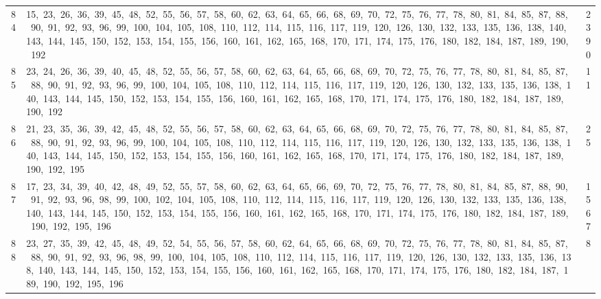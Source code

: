 \begin{longtable}{c|p{}|r}
84 & 15,\ 23,\ 26,\ 36,\ 39,\ 45,\ 48,\ 52,\ 55,\ 56,\ 57,\ 58,\ 60,\ 62,\ 63,\ 64,\ 65,\ 66,\ 68,\ 69,\ 70,\ 72,\ 75,\ 76,\ 77,\ 78,\ 80,\ 81,\ 84,\ 85,\ 87,\ 88,\ 90,\ 91,\ 92,\ 93,\ 96,\ 99,\ 100,\ 104,\ 105,\ 108,\ 110,\ 112,\ 114,\ 115,\ 116,\ 117,\ 119,\ 120,\ 126,\ 130,\ 132,\ 133,\ 135,\ 136,\ 138,\ 140,\ 143,\ 144,\ 145,\ 150,\ 152,\ 153,\ 154,\ 155,\ 156,\ 160,\ 161,\ 162,\ 165,\ 168,\ 170,\ 171,\ 174,\ 175,\ 176,\ 180,\ 182,\ 184,\ 187,\ 189,\ 190,\ 192 & 2390 \\
85 & 23,\ 24,\ 26,\ 36,\ 39,\ 40,\ 45,\ 48,\ 52,\ 55,\ 56,\ 57,\ 58,\ 60,\ 62,\ 63,\ 64,\ 65,\ 66,\ 68,\ 69,\ 70,\ 72,\ 75,\ 76,\ 77,\ 78,\ 80,\ 81,\ 84,\ 85,\ 87,\ 88,\ 90,\ 91,\ 92,\ 93,\ 96,\ 99,\ 100,\ 104,\ 105,\ 108,\ 110,\ 112,\ 114,\ 115,\ 116,\ 117,\ 119,\ 120,\ 126,\ 130,\ 132,\ 133,\ 135,\ 136,\ 138,\ 140,\ 143,\ 144,\ 145,\ 150,\ 152,\ 153,\ 154,\ 155,\ 156,\ 160,\ 161,\ 162,\ 165,\ 168,\ 170,\ 171,\ 174,\ 175,\ 176,\ 180,\ 182,\ 184,\ 187,\ 189,\ 190,\ 192 & 11 \\
86 & 21,\ 23,\ 35,\ 36,\ 39,\ 42,\ 45,\ 48,\ 52,\ 55,\ 56,\ 57,\ 58,\ 60,\ 62,\ 63,\ 64,\ 65,\ 66,\ 68,\ 69,\ 70,\ 72,\ 75,\ 76,\ 77,\ 78,\ 80,\ 81,\ 84,\ 85,\ 87,\ 88,\ 90,\ 91,\ 92,\ 93,\ 96,\ 99,\ 100,\ 104,\ 105,\ 108,\ 110,\ 112,\ 114,\ 115,\ 116,\ 117,\ 119,\ 120,\ 126,\ 130,\ 132,\ 133,\ 135,\ 136,\ 138,\ 140,\ 143,\ 144,\ 145,\ 150,\ 152,\ 153,\ 154,\ 155,\ 156,\ 160,\ 161,\ 162,\ 165,\ 168,\ 170,\ 171,\ 174,\ 175,\ 176,\ 180,\ 182,\ 184,\ 187,\ 189,\ 190,\ 192,\ 195 & 25 \\
87 & 17,\ 23,\ 34,\ 39,\ 40,\ 42,\ 48,\ 49,\ 52,\ 55,\ 57,\ 58,\ 60,\ 62,\ 63,\ 64,\ 65,\ 66,\ 69,\ 70,\ 72,\ 75,\ 76,\ 77,\ 78,\ 80,\ 81,\ 84,\ 85,\ 87,\ 88,\ 90,\ 91,\ 92,\ 93,\ 96,\ 98,\ 99,\ 100,\ 102,\ 104,\ 105,\ 108,\ 110,\ 112,\ 114,\ 115,\ 116,\ 117,\ 119,\ 120,\ 126,\ 130,\ 132,\ 133,\ 135,\ 136,\ 138,\ 140,\ 143,\ 144,\ 145,\ 150,\ 152,\ 153,\ 154,\ 155,\ 156,\ 160,\ 161,\ 162,\ 165,\ 168,\ 170,\ 171,\ 174,\ 175,\ 176,\ 180,\ 182,\ 184,\ 187,\ 189,\ 190,\ 192,\ 195,\ 196 & 1567 \\
88 & 23,\ 27,\ 35,\ 39,\ 42,\ 45,\ 48,\ 49,\ 52,\ 54,\ 55,\ 56,\ 57,\ 58,\ 60,\ 62,\ 64,\ 65,\ 66,\ 68,\ 69,\ 70,\ 72,\ 75,\ 76,\ 77,\ 78,\ 80,\ 81,\ 84,\ 85,\ 87,\ 88,\ 90,\ 91,\ 92,\ 93,\ 96,\ 98,\ 99,\ 100,\ 104,\ 105,\ 108,\ 110,\ 112,\ 114,\ 115,\ 116,\ 117,\ 119,\ 120,\ 126,\ 130,\ 132,\ 133,\ 135,\ 136,\ 138,\ 140,\ 143,\ 144,\ 145,\ 150,\ 152,\ 153,\ 154,\ 155,\ 156,\ 160,\ 161,\ 162,\ 165,\ 168,\ 170,\ 171,\ 174,\ 175,\ 176,\ 180,\ 182,\ 184,\ 187,\ 189,\ 190,\ 192,\ 195,\ 196 & 8 \\

\end{longtable}
